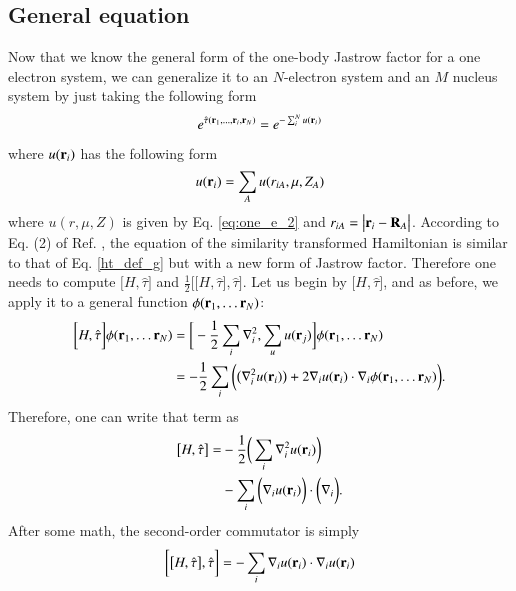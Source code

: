 \documentclass[aip,jcp,reprint,noshowkeys,superscriptaddress]{revtex4-1}
\newcommand{\br}[0]{{\bf {r}}}
\begin{document}
\subsection{General equation}
Now that we know the general form of the one-body Jastrow factor for a one electron system, we can generalize it 
to an $N$-electron system and an $M$ nucleus system by just taking the following form 
\begin{equation}
 e^{\hat{\tau}({\bf r}_1,\hdots , {\bf r}_i,{\bf r}_N)} = e^{-\sum_i^N u({\bf r}_i)} 
\end{equation}
where $u({\bf r}_i)$ has the following form 
\begin{equation}
 u({\bf r}_i) = \sum_{A} u(r_{iA},\mu,Z_A) 
\end{equation}
where $u(r,\mu,Z)$ is given by Eq. \eqref{eq:one_e_2} and $r_{iA} = \big|{\bf r}_i - {\bf R}_A \big|$. 
According to Eq. (2) of Ref. , the equation of the similarity transformed Hamiltonian is similar  
to that of Eq. \eqref{ht_def_g} but with a new form of Jastrow factor. 
Therefore one needs to compute $\big[ H,\hat{\tau} \big]$ and $\frac{1}{2}\bigg[ \big[H,\hat{\tau}\big],\hat{\tau}\bigg]$. 
Let us begin by $\big[ H,\hat{\tau} \big]$, and as before, we apply it to a general function $\phi(\br{}_1,\hdots \br{}_N)$:
\begin{equation}
 \label{eq:one_com1_1}
 \begin{aligned}
 \bigg[ H, \hat{\tau} \bigg]\phi(\br{}_1,\hdots \br{}_N) & = \bigg[ -\frac{1}{2} \sum_i \nabla^2_i, \sum_{u} u(\br{}_j) \bigg]      \phi(\br{}_1,\hdots \br{}_N) \\    
                                                        & = -\frac{1}{2} \sum_i \bigg( \big(\nabla^2_i u({\bf r}_i)\big) + 2\nabla_i u({\bf r}_i) \cdot \nabla_i \phi(\br{}_1,\hdots \br{}_N) \bigg).  
 \end{aligned}
\end{equation}
Therefore, one can write that term as
\begin{equation}
 \label{eq:one_com1_2}
 \begin{aligned}
  \big[ H,\hat{\tau} \big] =& -\frac{1}{2} \bigg( \sum_i \nabla^2_i u(\br{}_i) \bigg) \\
                            & -\sum_i \bigg(\nabla_i u(\br{}_i) \bigg) \cdot \bigg( \nabla_i  \bigg).
 \end{aligned}
\end{equation}
After some math, the second-order commutator is simply 
\begin{equation}
 \bigg[ \big[H,\hat{\tau}\big],\hat{\tau}\bigg] = -\sum_i \nabla_i u({\bf r}_i) \cdot \nabla_i u({\bf r}_i) 
\end{equation}
\end{document}
